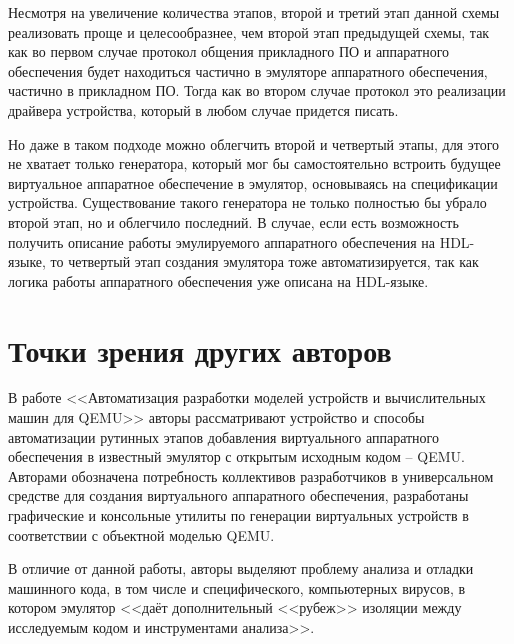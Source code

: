 
Несмотря на увеличение количества этапов, второй и третий этап данной схемы реализовать проще и
целесообразнее, чем второй этап предыдущей схемы, так как во первом случае
протокол общения прикладного ПО и аппаратного обеспечения будет находиться частично в
эмуляторе аппаратного обеспечения, частично в прикладном ПО.
Тогда как во втором случае протокол это реализации драйвера устройства, который в любом случае придется писать.

Но даже в таком подходе можно облегчить второй и четвертый этапы, для этого не хватает только
генератора, который мог бы самостоятельно встроить будущее виртуальное аппаратное обеспечение
в эмулятор, основываясь на спецификации устройства.
Существование такого генератора не только полностью бы убрало второй этап, но и облегчило последний.
В случае, если есть возможность получить описание работы эмулируемого аппаратного обеспечения на HDL-языке,
то четвертый этап создания эмулятора тоже автоматизируется, так как логика работы аппаратного обеспечения
уже описана на HDL-языке.


\section{Точки зрения других авторов}\label{sec:ch1/sec2}

В работе <<Автоматизация разработки моделей устройств и вычислительных машин для QEMU>> \cite{imposters}
авторы рассматривают устройство и способы автоматизации рутинных этапов добавления виртуального
аппаратного обеспечения в известный эмулятор с открытым исходным кодом -- QEMU.
Авторами обозначена потребность коллективов разработчиков в универсальном средстве
для создания виртуального аппаратного обеспечения,
разработаны графические и консольные утилиты по генерации виртуальных устройств
в соответствии с объектной моделью QEMU.

В отличие от данной работы, авторы выделяют проблему анализа и отладки машинного кода,
в том числе и специфического, компьютерных вирусов, в котором эмулятор <<даёт дополнительный
<<рубеж>> изоляции между исследуемым кодом и инструментами анализа>>.


